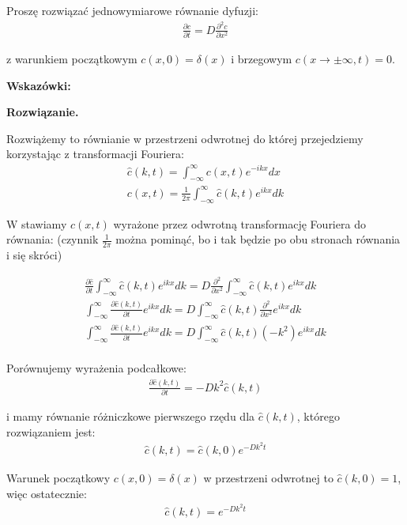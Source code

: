 \documentclass[11pt,a4paper]{article}
\newenvironment{solution}{\vspace{1cm} \par\textbf{Rozwiązanie.} \vspace{1cm}}{}
\begin{document}
Proszę rozwiązać jednowymiarowe równanie dyfuzji:
\begin{align*}
    \frac{\partial c}{\partial t} = D \frac{\partial^2 c}{\partial x^2}
\end{align*}

z warunkiem początkowym $c(x, 0) = \delta(x)$ i brzegowym 
$c(x \to \pm \infty, t) = 0$.

{\bf Wskazówki:}

\begin{solution}

Rozwiążemy to równianie w przestrzeni odwrotnej do  
której przejedziemy korzystając z transformacji Fouriera:
\begin{align*}
    \hat{c}(k, t) = \int_{-\infty}^{\infty} c(x, t) e^{-ikx} dx \\
    c(x, t) =  \frac{1}{2\pi}\int_{-\infty}^{\infty} \hat{c}(k, t) e^{ikx} dk
\end{align*}

W stawiamy $c(x, t)$ wyrażone przez odwrotną transformację Fouriera do równania:
(czynnik $\frac{1}{2\pi}$ można pominąć, bo i tak będzie po obu stronach równania 
i się skróci)

\begin{align*}
    \frac{\partial \hat{c}}{\partial t} \int_{-\infty}^{\infty} \hat{c}(k,t) e^{ikx} dk = 
     D\frac{\partial^{2}}{\partial x^2}  \int_{-\infty}^{\infty} \hat{c}(k,t) e^{ikx} dk \\
    \int_{-\infty}^{\infty} \frac{\partial \hat{c}(k,t)}{\partial t} e^{ikx} dk = 
     D \int_{-\infty}^{\infty} \hat{c}(k,t) \frac{\partial^2}{\partial x^2} e^{ikx}dk \\
    \int_{-\infty}^{\infty} \frac{\partial \hat{c}(k,t)}{\partial t} e^{ikx} dk = 
     D \int_{-\infty}^{\infty} \hat{c}(k,t) (-k^2) e^{ikx}dk \\
\end{align*}

Porównujemy wyrażenia podcałkowe:
\begin{align*}
    \frac{\partial \hat{c}(k,t)}{\partial t} = -Dk^2 \hat{c}(k,t)
\end{align*}

i mamy równanie różniczkowe pierwszego rzędu dla $\hat{c}(k,t)$, 
którego rozwiązaniem jest:
\begin{align*}
    \hat{c}(k,t) = \hat{c}(k,0) e^{-Dk^2 t}
\end{align*}

Warunek początkowy $c(x, 0) = \delta(x)$ w przestrzeni odwrotnej to $\hat{c}(k,0) = 1$,
więc ostatecznie:
\begin{align*}
    \hat{c}(k,t) = e^{-Dk^2 t}
\end{align*}


\end{solution}
\end{document}

